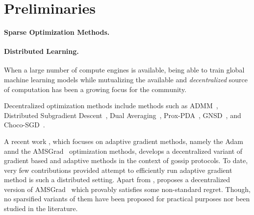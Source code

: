 \documentclass[11pt]{article}
\begin{document}
\section{Preliminaries}\label{sec:prelim}

\paragraph{Sparse Optimization Methods. } 


\paragraph{Distributed Learning. }
When a large number of compute engines is available, being able to train global machine learning models while mutualizing the available and \emph{decentralized} source of computation has been a growing focus for the community.

Decentralized optimization methods include methods such as ADMM~\citep{boyd2011distributed}, Distributed Subgradient Descent~\citep{nedic2009distributed}, Dual Averaging~\citep{duchi2011dual}, Prox-PDA~\citep{hong2017prox}, GNSD~\citep{lu2019gnsd}, and Choco-SGD~\citep{koloskova2019decentralized}.  

A recent work \citep{chen2020quantized}, which focuses on adaptive gradient methods, namely the Adam \citep{kingma2014adam} annd the  AMSGrad~\citep{reddi2019convergence} optimization methods, develops a decentralized variant of gradient based and adaptive methods in the context of gossip protocols.
To date, very few contributions provided attempt to efficiently run adaptive gradient method is such a distributed setting.
Apart from \citep{chen2020quantized}, \citet{nazari2019dadam} proposes a decentralized version of AMSGrad~\citep{reddi2019convergence} which provably satisfies some non-standard regret.
Though, no sparsified variants of them have been proposed for practical purposes nor been studied in the literature.
\end{document}
